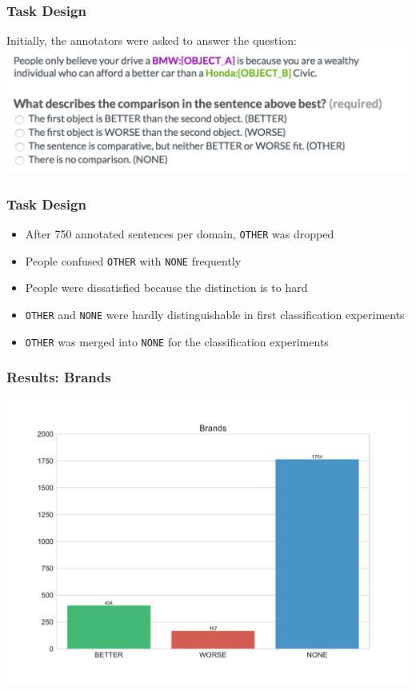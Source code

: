 \documentclass[11pt,aspectratio=169]{beamer}
\begin{document}
    \begin{frame}
        \frametitle{Task Design}
        Initially, the annotators were asked to answer the question:
        \includegraphics[scale=0.3]{images/q1other}
    \end{frame}


    \begin{frame}
        \frametitle{Task Design}
        \begin{itemize}
            \item After 750 annotated sentences per domain, \texttt{OTHER} was dropped
            \item People confused \texttt{OTHER} with \texttt{NONE} frequently
            \item People were dissatisfied because the distinction is to hard
            \item \texttt{OTHER} and \texttt{NONE} were hardly distinguishable in first classification experiments
            \item \texttt{OTHER} was merged into \texttt{NONE} for the classification experiments
        \end{itemize}
    \end{frame}


    \begin{frame}
        \frametitle{Results: Brands}
        \begin{center}
            \includegraphics[scale=0.3]{images/Brands-dist}
        \end{center}
    \end{frame}
\end{document}
